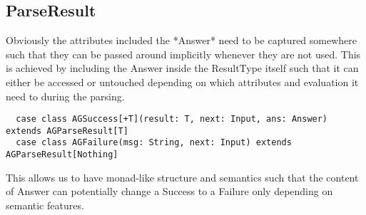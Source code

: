 \subsection{ParseResult}
Obviously the attributes included the *Answer* need to be captured somewhere such that they can be passed around implicitly whenever they are not used. This is achieved by including the Answer inside the ResultType itself such that it can either be accessed or untouched depending on which attributes and evaluation it need to during the parsing.

\begin{lstlisting}
  case class AGSuccess[+T](result: T, next: Input, ans: Answer) extends AGParseResult[T]
  case class AGFailure(msg: String, next: Input) extends AGParseResult[Nothing]
\end{lstlisting}

This allows us to have monad-like structure and semantics such that the content of Answer can potentially change a Success to a Failure only depending on semantic features.
